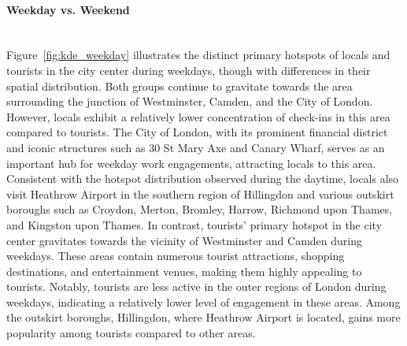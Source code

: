 \documentclass{article}
\newcommand{\subsubsubsection}[1]{\paragraph{#1}\mbox{}\\}
\begin{document}
\subsubsubsection{Weekday vs. Weekend}
Figure~\ref{fig:kde_weekday} illustrates the distinct primary hotspots of locals and tourists in the city center during weekdays, though with differences in their spatial distribution. Both groups continue to gravitate towards the area surrounding the junction of Westminster, Camden, and the City of London. However, locals exhibit a relatively lower concentration of check-ins in this area compared to tourists. The City of London, with its prominent financial district and iconic structures such as 30 St Mary Axe and Canary Wharf, serves as an important hub for weekday work engagements, attracting locals to this area. Consistent with the hotspot distribution observed during the daytime, locals also visit Heathrow Airport in the southern region of Hillingdon and various outskirt boroughs such as Croydon, Merton, Bromley, Harrow, Richmond upon Thames, and Kingston upon Thames. In contrast, tourists' primary hotspot in the city center gravitates towards the vicinity of Westminster and Camden during weekdays. These areas contain numerous tourist attractions, shopping destinations, and entertainment venues, making them highly appealing to tourists. Notably, tourists are less active in the outer regions of London during weekdays, indicating a relatively lower level of engagement in these areas. Among the outskirt boroughs, Hillingdon, where Heathrow Airport is located, gains more popularity among tourists compared to other areas.
\end{document}
